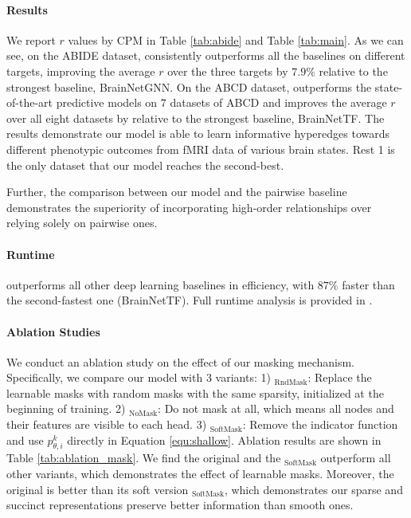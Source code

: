 
\paragraph{Results}
We report $r$ values by CPM in Table \ref{tab:abide} and Table \ref{tab:main}. As we can see, on the ABIDE dataset, \hybrid{} consistently outperforms all the baselines on different targets, improving the average $r$ over the three targets by $7.9\%$ relative to the strongest baseline, BrainNetGNN.
On the ABCD dataset, \hybrid{} outperforms the state-of-the-art predictive models on $7$ datasets of ABCD and improves the average $r$ over all eight datasets by \avgimp{} relative to the strongest baseline, BrainNetTF. The results demonstrate our model is able to learn informative hyperedges towards different phenotypic outcomes from fMRI data of various brain states. Rest 1 is the only dataset that our model reaches the second-best.

Further, the comparison between our model and the pairwise baseline demonstrates the superiority of incorporating high-order relationships over relying solely on pairwise ones.

\paragraph{Runtime} \hybrid{} outperforms all other deep learning baselines in efficiency, with $87\%$ faster than the second-fastest one (BrainNetTF). Full runtime analysis is provided in \citet{qiu2023learning}.

\paragraph{Ablation Studies}
We conduct an ablation study on the effect of our masking mechanism. Specifically, we compare our model with $3$ variants: 1) \hybrid$_\mathrm{RndMask}$: Replace the learnable masks with random masks with the same sparsity, initialized at the beginning of training. 2) \hybrid$_\mathrm{NoMask}$: Do not mask at all, which means all nodes and their features are visible to each head. 3) \hybrid$_\mathrm{SoftMask}$: Remove the indicator function and use $p^k_{\theta, i}$ directly in Equation \ref{equ:shallow}. Ablation results are shown in Table \ref{tab:ablation_mask}. We find the original \hybrid{} and the \hybrid$_\mathrm{SoftMask}$ outperform all other variants, which demonstrates the effect of learnable masks. Moreover, the original \hybrid{} is better than its soft version \hybrid$_\mathrm{SoftMask}$, which demonstrates our sparse and succinct representations preserve better information than smooth ones.


